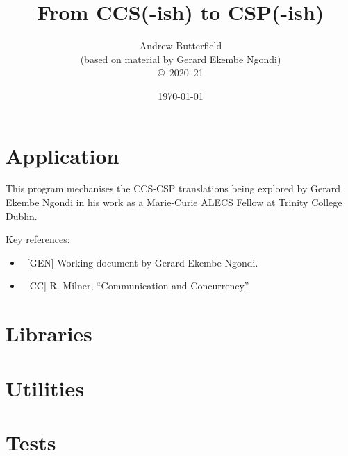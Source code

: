 \documentclass[fleqn,10pt]{report}
\author{
Andrew Butterfield
\\(based on material by Gerard Ekembe Ngondi)
\\
{\small \copyright\ 2020--21}
}
\title{
  From CCS(-ish) to CSP(-ish)
}
\date{
\today
}
\begin{document}
\maketitle
\setcounter{tocdepth}{4}
\tableofcontents


\chapter{Application}

This program mechanises the CCS-CSP translations
being explored by Gerard Ekembe Ngondi
in his work as a Marie-Curie ALECS Fellow at Trinity College Dublin.

Key references:
\begin{itemize}
  \item ~[GEN] Working document by Gerard Ekembe Ngondi.
  \item ~[CC] R. Milner, ``Communication and Concurrency''.
\end{itemize}

\newpage


\chapter{Libraries}

\newpage

\newpage

\newpage


\appendix

\chapter{Utilities}
\newpage



\chapter{Tests}

\newpage


% 



\end{document}
